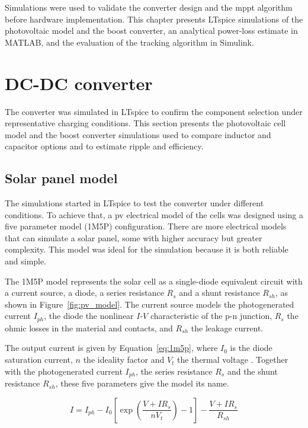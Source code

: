 \label{chap:sims}

    Simulations were used to validate the converter design and the \ac{mppt} algorithm before hardware implementation. This chapter presents LTspice simulations of the photovoltaic model and the boost converter, an analytical power-loss estimate in MATLAB, and the evaluation of the tracking algorithm in Simulink.

    \section{DC-DC converter}

        The converter was simulated in LTspice to confirm the component selection under representative charging conditions. This section presents the photovoltaic cell model and the boost converter simulations used to compare inductor and capacitor options and to estimate ripple and efficiency.

    \subsection{Solar panel model}

        The simulations started in LTspice to test the converter under different conditions. To achieve that, a \ac{pv} electrical model of the cells was designed using a five parameter model (1M5P) configuration. There are more electrical models that can simulate a solar panel, some with higher accuracy but greater complexity. This model was ideal for the simulation because it is both reliable and simple.

        The 1M5P model represents the solar cell as a single-diode equivalent circuit with a current source, a diode, a series resistance $R_s$ and a shunt resistance $R_{sh}$, as shown in Figure~\ref{fig:pv_model}. The current source models the photogenerated current $I_{ph}$, the diode the nonlinear $I$-$V$ characteristic of the p-n junction, $R_s$ the ohmic losses in the material and contacts, and $R_{sh}$ the leakage current.

        The output current is given by Equation~\ref{eq:1m5p}, where $I_0$ is the diode saturation current, $n$ the ideality factor and $V_t$ the thermal voltage \cite{LOBRANO2013894}. Together with the photogenerated current $I_{ph}$, the series resistance $R_s$ and the shunt resistance $R_{sh}$, these five parameters give the model its name.

        \begin{equation}
            I = I_{ph} - I_0 \left[ \exp\left(\frac{V + I R_s}{n V_t}\right) - 1 \right] - \frac{V + I R_s}{R_{sh}}
            \label{eq:1m5p}
        \end{equation}

